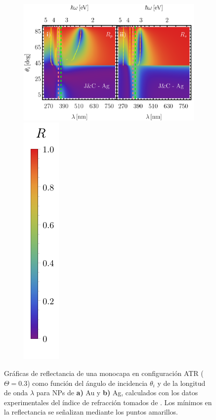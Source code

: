 \begin{figure}[h!]
	\begin{subfigure}{.01\linewidth}\caption{}\label{sfig:JCAg}\vspace{3cm}\end{subfigure}\hspace*{-1em}
	\begin{subfigure}{.45\linewidth}\centering \includegraphics[width = .95\linewidth, trim={00 05 00 00}, clip]{2-Resultados/figs/6-JCAg/0-2D_Grid.png}\includegraphics[scale=.6, trim={00 00 00 00}, clip]{2-Resultados/figs/0-RBar_v}\end{subfigure}
	\caption{Gráficas de reflectancia de una monocapa en configuración ATR ($\Theta = 0. 3$) como función del ángulo de incidencia $\theta_i$ y de la longitud de onda $\lambda$ para NPs de \textbf{a)} Au y \textbf{b)} Ag, calculados con los datos experimentales del índice de refracción tomados de \cite{johnson1972constants}.  Los mínimos en la reflectancia se señalizan mediante los puntos amarillos. }\label{fig:R-JC}
	\end{figure}	

